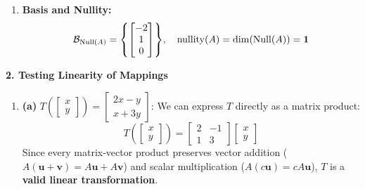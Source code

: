 \begin{enumerate}
\begin{equation*}
    \end{equation*}
    \item \textbf{Basis and Nullity:}
    \begin{equation*}
    \mathcal{B}_{\operatorname{Null}(A)} = \mathbf{\left\{ \begin{bmatrix} -2 \\ 1 \\ 0 \end{bmatrix} \right\}}, \quad \operatorname{nullity}(A) = \dim(\operatorname{Null}(A)) = \mathbf{1}
    \end{equation*}
\end{enumerate}

\textbf{2. Testing Linearity of Mappings}
\begin{enumerate}
    \item \textbf{(a)} $T\left(\begin{bmatrix} x \\ y \end{bmatrix}\right) = \begin{bmatrix} 2x - y \\ x + 3y \end{bmatrix}$:
    We can express $T$ directly as a matrix product:
    \begin{equation*}
    T\left(\begin{bmatrix} x \\ y \end{bmatrix}\right) = \begin{bmatrix} 2 & -1 \\ 1 & 3 \end{bmatrix} \begin{bmatrix} x \\ y \end{bmatrix}
    \end{equation*}
    Since every matrix-vector product preserves vector addition ($A(\mathbf{u}+\mathbf{v}) = A\mathbf{u}+A\mathbf{v}$) and scalar multiplication ($A(c\mathbf{u}) = cA\mathbf{u}$), $T$ is a \textbf{valid linear transformation}.


\end{enumerate}

